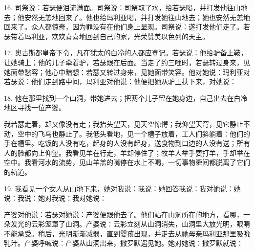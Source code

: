 16. 司祭说：若瑟便泪流满面。司祭说：司祭取了水，给若瑟喝，并打发他往山地去；他安然无恙地回来了。他也给玛利亚喝，并打发她往山地去；她也安然无恙地回来了。众人都惊奇，因为罪没有在他们身上显现。司祭说：遂打发他们走了。若瑟带着玛利亚，欢欢喜喜地回到自己的家，光荣赞美以色列的天主。\par

17. 奥古斯都皇帝下令，凡在犹太的白冷的人都应登记。若瑟说：他给驴备上鞍，让她骑上；他的儿子牵着驴，若瑟跟在后面。当走了约三哩时，若瑟转过身来，见她面带愁容；他心中暗想：若瑟又转过身来，见她面带笑容。他对她说：玛利亚对若瑟说：他们走到路中间，玛利亚对他说：他便把她从驴上扶下来，对她说：\par

18. 他在那里找到一个山洞，带她进去；把两个儿子留在她身边，自己出去在白冷地区寻找一位产婆。\par

我若瑟走着，却又像没有走；我抬头望天，见天空惊愕；我仰望天穹，见它静止不动，空中的飞鸟也静止了。我低头看地，见一个槽子放着，工人们斜躺着：他们的手在槽里。吃饭的人没有吃，起身的人没有起身，送食物到口边的人没有送；所有人的脸都向上仰望。我看见羊在行走，羊却停住了；牧羊人举手要打羊，手却举在空中。我看河水的流势，见山羊羔的嘴停在水上不喝，一切事物瞬间都脱离了它们的轨道。\par

19. 我看见一个女人从山地下来，她对我说：我说：她回答我说：我对她说：她说：我说：她对我说：我对她说：\par

产婆对他说：若瑟对她说：产婆便跟他去了。他们站在山洞所在的地方，看哪，一朵发光的云彩笼罩了山洞。产婆说：云彩立刻从山洞消失，山洞里大放光明，眼睛不能承受。稍后，光明渐渐减弱，直到婴孩出现，并走去从祂母亲玛利亚那里吸吮乳汁。产婆呼喊说：产婆从山洞出来，撒罗默遇见她。她对她说：撒罗默就说：\par

